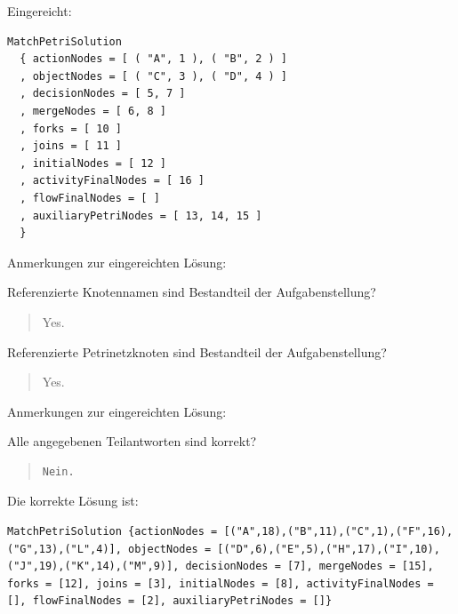 Eingereicht:


\begin{verbatim}
MatchPetriSolution 
  { actionNodes = [ ( "A", 1 ), ( "B", 2 ) ]
  , objectNodes = [ ( "C", 3 ), ( "D", 4 ) ]
  , decisionNodes = [ 5, 7 ]
  , mergeNodes = [ 6, 8 ]
  , forks = [ 10 ]
  , joins = [ 11 ]
  , initialNodes = [ 12 ]
  , activityFinalNodes = [ 16 ]
  , flowFinalNodes = [ ]
  , auxiliaryPetriNodes = [ 13, 14, 15 ] 
  }
\end{verbatim}


Anmerkungen zur eingereichten Lösung:

Referenzierte Knotennamen sind Bestandteil der Aufgabenstellung?\begin{quote}Yes.\end{quote}Referenzierte Petrinetzknoten sind Bestandteil der Aufgabenstellung?\begin{quote}Yes.\end{quote}Anmerkungen zur eingereichten Lösung:

Alle angegebenen Teilantworten sind korrekt?

\begin{quote}
\begin{verbatim}
Nein.
\end{verbatim}
\end{quote}

Die korrekte Lösung ist:
\begin{verbatim}
MatchPetriSolution {actionNodes = [("A",18),("B",11),("C",1),("F",16),("G",13),("L",4)], objectNodes = [("D",6),("E",5),("H",17),("I",10),("J",19),("K",14),("M",9)], decisionNodes = [7], mergeNodes = [15], forks = [12], joins = [3], initialNodes = [8], activityFinalNodes = [], flowFinalNodes = [2], auxiliaryPetriNodes = []}
\end{verbatim}


